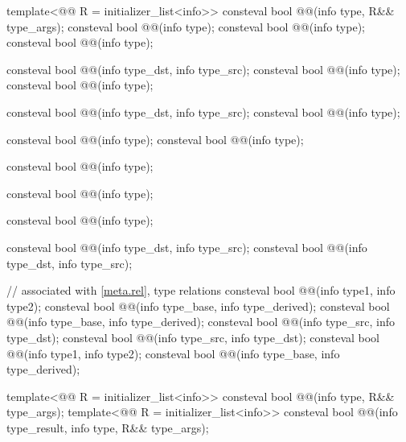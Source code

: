 \begin{codeblock}
template<@@ R = initializer_list<info>>
  consteval bool @@(info type, R&& type_args);
consteval bool @@(info type);
consteval bool @@(info type);
consteval bool @@(info type);

consteval bool @@(info type_dst, info type_src);
consteval bool @@(info type);
consteval bool @@(info type);

consteval bool @@(info type_dst, info type_src);
consteval bool @@(info type);

consteval bool @@(info type);
consteval bool @@(info type);

consteval bool @@(info type);

consteval bool @@(info type);

consteval bool @@(info type);

consteval bool @@(info type_dst, info type_src);
consteval bool @@(info type_dst, info type_src);

// associated with \ref{meta.rel}, type relations
consteval bool @@(info type1, info type2);
consteval bool @@(info type_base, info type_derived);
consteval bool @@(info type_base, info type_derived);
consteval bool @@(info type_src, info type_dst);
consteval bool @@(info type_src, info type_dst);
consteval bool @@(info type1, info type2);
consteval bool @@(info type_base, info type_derived);

template<@@ R = initializer_list<info>>
  consteval bool @@(info type, R&& type_args);
template<@@ R = initializer_list<info>>
  consteval bool @@(info type_result, info type, R&& type_args);


\end{codeblock}
